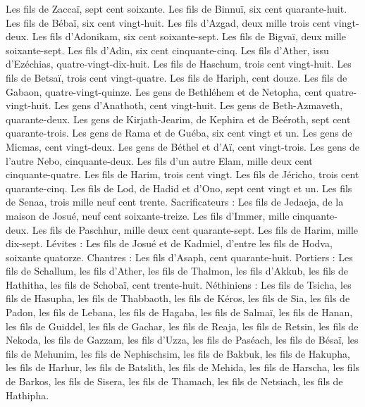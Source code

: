 \begin{multicols}{2}
Les fils de Zaccaï, sept cent soixante.
Les fils de Binnuï, six cent quarante-huit.
Les fils de Bébaï, six cent vingt-huit.
Les fils d’Azgad, deux mille trois cent vingt-deux.
Les fils d'Adonikam, six cent soixante-sept.
Les fils de Bigvaï, deux mille soixante-sept.
Les fils d’Adin, six cent cinquante-cinq.
Les fils d'Ather, issu d'Ezéchias, quatre-vingt-dix-huit.
Les fils de Haschum, trois cent vingt-huit.
Les fils de Betsaï, trois cent vingt-quatre.
Les fils de Hariph, cent douze.
Les fils de Gabaon, quatre-vingt-quinze.
Les gens de Bethléhem et de Netopha, cent quatre-vingt-huit.
Les gens d'Anathoth, cent vingt-huit.
Les gens de Beth-Azmaveth, quarante-deux.
Les gens de Kirjath-Jearim, de Kephira et de Beéroth, sept cent quarante-trois.
Les gens de Rama et de Guéba, six cent vingt et un.
Les gens de Micmas, cent vingt-deux.
Les gens de Béthel et d’Aï, cent vingt-trois.
Les gens de l'autre Nebo, cinquante-deux.
Les fils d'un autre Elam, mille deux cent cinquante-quatre.
Les fils de Harim, trois cent vingt.
Les fils de Jéricho, trois cent quarante-cinq.
Les fils de Lod, de Hadid et d'Ono, sept cent vingt et un.
Les fils de Senaa, trois mille neuf cent trente.
Sacrificateurs : Les fils de Jedaeja, de la maison de Josué, neuf cent soixante-treize.
Les fils d'Immer, mille cinquante-deux.
Les fils de Paschhur, mille deux cent quarante-sept.
Les fils de Harim, mille dix-sept.
Lévites : Les fils de Josué et de Kadmiel, d'entre les fils de Hodva, soixante quatorze.
Chantres : Les fils d'Asaph, cent quarante-huit.
Portiers : Les fils de Schallum, les fils d'Ather, les fils de Thalmon, les fils d'Akkub, les fils de Hathitha, les fils de Schobaï, cent trente-huit.
Néthiniens : Les fils de Tsicha, les fils de Hasupha, les fils de Thabbaoth,
les fils de Kéros, les fils de Sia, les fils de Padon,
les fils de Lebana, les fils de Hagaba, les fils de Salmaï,
les fils de Hanan, les fils de Guiddel, les fils de Gachar,
les fils de Reaja, les fils de Retsin, les fils de Nekoda,
les fils de Gazzam, les fils d’Uzza, les fils de Paséach,
les fils de Bésaï, les fils de Mehunim, les fils de Nephischsim,
les fils de Bakbuk, les fils de Hakupha, les fils de Harhur,
les fils de Batslith, les fils de Mehida, les fils de Harscha,
les fils de Barkos, les fils de Sisera, les fils de Thamach,
les fils de Netsiach, les fils de Hathipha.

\end{multicols}
